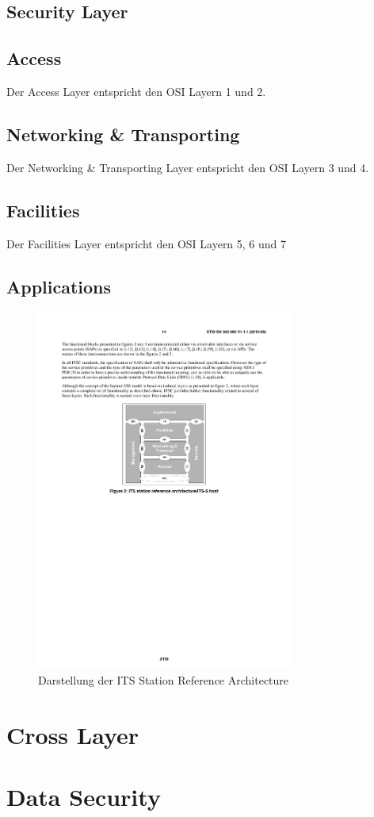 \subsection{Security Layer}

\subsection{Access}
Der Access Layer entspricht den \ac{OSI} Layern 1 und 2. 

\subsection{Networking \& Transporting}
Der Networking \& Transporting Layer entspricht den \ac{OSI} Layern 3 und 4.

\subsection{Facilities}
Der Facilities Layer entspricht den \ac{OSI} Layern 5, 6 und 7

\subsection{Applications}


\begin{figure}
\includegraphics[width=0.75\textwidth]{content/images/02_architektur/stationReferenceArchitecture.pdf}
\caption{Darstellung der ITS Station Reference Architecture \cite{etsi2010302}}
\label{fig:funktionsweise_referenceArchitecture}
\end{figure}

\section{Cross Layer}

\section{Data Security}

